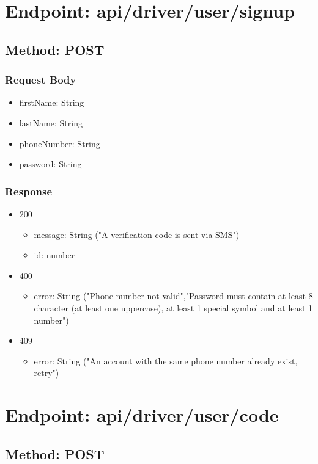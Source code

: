 \section*{Endpoint: api/driver/user/signup}
\subsection*{Method: POST}
\subsubsection*{Request Body}
\begin{itemize}
    \item firstName: String
    \item lastName: String
    \item phoneNumber: String
    \item password: String
\end{itemize}
\subsubsection*{Response}
\begin{itemize}
    \item 200
          \begin{itemize}
              \item message: String ("A verification code is sent via SMS")
              \item id: number
          \end{itemize}
    \item 400
          \begin{itemize}
              \item error: String ("Phone number not valid","Password must contain at least 8 character (at least one uppercase), at least 1 special symbol and at least 1 number")
          \end{itemize}
    \item 409
          \begin{itemize}
              \item error: String ("An account with the same phone number already exist, retry")
          \end{itemize}
\end{itemize}

\section*{Endpoint: api/driver/user/code}
\subsection*{Method: POST}
